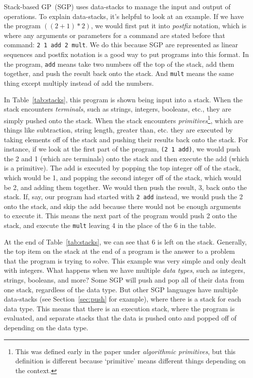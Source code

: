 \documentclass{sig-alternate}
\begin{document}
Stack-based GP~(SGP) uses data-stacks to manage the input and output of operations. To explain data-stacks, it's helpful to look at an example. If we have the program $((2+1)*2)$, we would first put it into \textit{postfix} notation, which is where any arguments or parameters for a command are stated before that command: \texttt{2~1~add~2~mult}. We do this because SGP are represented as linear sequences and postfix notation is a good way to put programs into this format. In the program, \texttt{add} means take two numbers off the top of the stack, add them together, and push the result back onto the stack. And \texttt{mult} means the same thing except multiply instead of add the numbers.

In Table~\ref{tab:stacks}, this program is shown being input into a stack. When the stack encounters \textit{terminals}, such as strings, integers, booleans, etc., they are simply pushed onto the stack. When the stack encounters \textit{primitives}\footnote{This was defined early in the paper under \textit{algorithmic primitives}, but this definition is different because `primitive' means different things depending on the context.}, which are things like subtraction, string length, greater than, etc. they are executed by taking elements off of the stack and pushing their results back onto the stack. For instance, if we look at the first part of the program, \texttt{(2~1~add)}, we would push the 2 and 1 (which are terminals) onto the stack and then execute the add (which is a primitive). The add is executed by popping the top integer off of the stack, which would be 1, and popping the second integer off of the stack, which would be 2, and adding them together. We would then push the result, 3, back onto the stack. If, say, our program had started with \texttt{2 add} instead, we would push the 2 onto the stack, and skip the add because there would not be enough arguments to execute it. This means the next part of the program would push 2 onto the stack, and execute the \texttt{mult} leaving 4 in the place of the 6 in the table.

At the end of Table~\ref{tab:stacks}, we can see that 6 is left on the stack. Generally, the top item on the stack at the end of a program is the answer to a problem that the program is trying to solve. This example was very simple and only dealt with integers. What happens when we have multiple \textit{data types}, such as integers, strings, booleans, and more? Some SGP will push and pop all of their data from one stack, regardless of the data type. But other SGP languages have multiple data-stacks (see Section~\ref{sec:push} for example), where there is a stack for each data type. This means that there is an execution stack, where the program is evaluated, and separate stacks that the data is pushed onto and popped off of depending on the data type.
\end{document}
